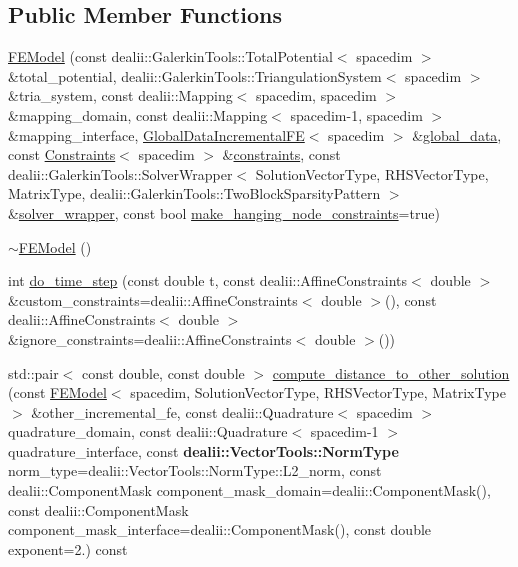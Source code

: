 \subsection*{Public Member Functions}
\begin{DoxyCompactItemize}
\item 
\hyperlink{classincremental_f_e_1_1_f_e_model_a230a5830a967893387b9010b9bd9b65b}{F\+E\+Model} (const dealii\+::\+Galerkin\+Tools\+::\+Total\+Potential$<$ spacedim $>$ \&total\+\_\+potential, dealii\+::\+Galerkin\+Tools\+::\+Triangulation\+System$<$ spacedim $>$ \&tria\+\_\+system, const dealii\+::\+Mapping$<$ spacedim, spacedim $>$ \&mapping\+\_\+domain, const dealii\+::\+Mapping$<$ spacedim-\/1, spacedim $>$ \&mapping\+\_\+interface, \hyperlink{classincremental_f_e_1_1_global_data_incremental_f_e}{Global\+Data\+Incremental\+FE}$<$ spacedim $>$ \&\hyperlink{classincremental_f_e_1_1_f_e_model_aa6f80778241b26906af1f571517102dd}{global\+\_\+data}, const \hyperlink{classincremental_f_e_1_1_constraints}{Constraints}$<$ spacedim $>$ \&\hyperlink{classincremental_f_e_1_1_f_e_model_a33a622c3c53ea4bee3bdefac06201c70}{constraints}, const dealii\+::\+Galerkin\+Tools\+::\+Solver\+Wrapper$<$ Solution\+Vector\+Type, R\+H\+S\+Vector\+Type, Matrix\+Type, dealii\+::\+Galerkin\+Tools\+::\+Two\+Block\+Sparsity\+Pattern $>$ \&\hyperlink{classincremental_f_e_1_1_f_e_model_a609de66ca9623d737bf3a45a37bb7690}{solver\+\_\+wrapper}, const bool \hyperlink{classincremental_f_e_1_1_f_e_model_a65b5910cfba2feb26933ad451ceff628}{make\+\_\+hanging\+\_\+node\+\_\+constraints}=true)
\item 
\hyperlink{classincremental_f_e_1_1_f_e_model_ae4d9513474928ef225245928410f984b}{$\sim$\+F\+E\+Model} ()
\item 
int \hyperlink{classincremental_f_e_1_1_f_e_model_a1528bdeba89d6f4774526a2ed9412047}{do\+\_\+time\+\_\+step} (const double t, const dealii\+::\+Affine\+Constraints$<$ double $>$ \&custom\+\_\+constraints=dealii\+::\+Affine\+Constraints$<$ double $>$(), const dealii\+::\+Affine\+Constraints$<$ double $>$ \&ignore\+\_\+constraints=dealii\+::\+Affine\+Constraints$<$ double $>$())
\item 
std\+::pair$<$ const double, const double $>$ \hyperlink{classincremental_f_e_1_1_f_e_model_af3c39fb15e308e6979b55fc4b988b3a2}{compute\+\_\+distance\+\_\+to\+\_\+other\+\_\+solution} (const \hyperlink{classincremental_f_e_1_1_f_e_model}{F\+E\+Model}$<$ spacedim, Solution\+Vector\+Type, R\+H\+S\+Vector\+Type, Matrix\+Type $>$ \&other\+\_\+incremental\+\_\+fe, const dealii\+::\+Quadrature$<$ spacedim $>$ quadrature\+\_\+domain, const dealii\+::\+Quadrature$<$ spacedim-\/1 $>$ quadrature\+\_\+interface, const {\bf dealii\+::\+Vector\+Tools\+::\+Norm\+Type} norm\+\_\+type=dealii\+::\+Vector\+Tools\+::\+Norm\+Type\+::\+L2\+\_\+norm, const dealii\+::\+Component\+Mask component\+\_\+mask\+\_\+domain=dealii\+::\+Component\+Mask(), const dealii\+::\+Component\+Mask component\+\_\+mask\+\_\+interface=dealii\+::\+Component\+Mask(), const double exponent=2.) const 

\end{DoxyCompactItemize}
